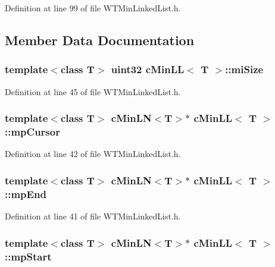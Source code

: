 Definition at line 99 of file WTMinLinkedList.h.



\subsection{Member Data Documentation}
\hypertarget{classc_min_l_l_a8599d074fd5423f7fcaa227f18112dd8}{
\subsubsection[{miSize}]{\setlength{\rightskip}{0pt plus 5cm}template$<$class T$>$ uint32 {\bf cMinLL}$<$ T $>$::{\bf miSize}}}
\label{classc_min_l_l_a8599d074fd5423f7fcaa227f18112dd8}


Definition at line 45 of file WTMinLinkedList.h.

\hypertarget{classc_min_l_l_ac77e47f1340f8041a71c48332033b257}{
\subsubsection[{mpCursor}]{\setlength{\rightskip}{0pt plus 5cm}template$<$class T$>$ {\bf cMinLN}$<$T$>$$\ast$ {\bf cMinLL}$<$ T $>$::{\bf mpCursor}}}
\label{classc_min_l_l_ac77e47f1340f8041a71c48332033b257}


Definition at line 42 of file WTMinLinkedList.h.

\hypertarget{classc_min_l_l_a7db7e101b2a97812eceed815c2860ba2}{
\subsubsection[{mpEnd}]{\setlength{\rightskip}{0pt plus 5cm}template$<$class T$>$ {\bf cMinLN}$<$T$>$$\ast$ {\bf cMinLL}$<$ T $>$::{\bf mpEnd}}}
\label{classc_min_l_l_a7db7e101b2a97812eceed815c2860ba2}


Definition at line 41 of file WTMinLinkedList.h.

\hypertarget{classc_min_l_l_a4ce5199aa6440c0cbcfef8761db52d2a}{
\subsubsection[{mpStart}]{\setlength{\rightskip}{0pt plus 5cm}template$<$class T$>$ {\bf cMinLN}$<$T$>$$\ast$ {\bf cMinLL}$<$ T $>$::{\bf mpStart}}}
\label{classc_min_l_l_a4ce5199aa6440c0cbcfef8761db52d2a}


